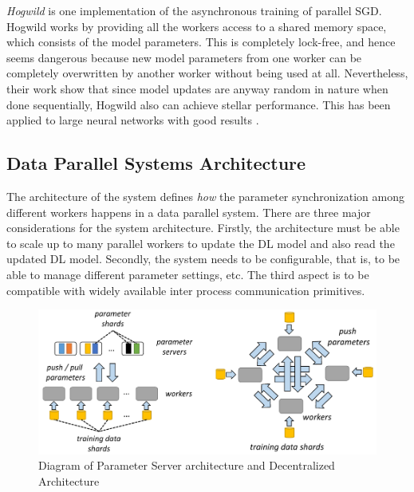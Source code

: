 \emph{Hogwild} \cite{Niu2011HOGWILD:Descent} is one implementation of the asynchronous training of parallel SGD. Hogwild works by providing all the workers access to a shared memory space, which consists of the model parameters. This is completely lock-free, and hence seems dangerous because new model parameters from one worker can be completely overwritten by another worker without being used at all. Nevertheless, their work show that since model updates are anyway random in nature when done sequentially, Hogwild also can achieve stellar performance. This has been applied to large neural networks with good results \cite{Deyringer2017ParallelizationHogwild}. 


\subsection{Data Parallel Systems Architecture}
The architecture of the system defines \emph{how} the parameter synchronization among different workers happens in a data parallel system. There are three major considerations for the system architecture. Firstly, the architecture must be able to scale up to many parallel workers to update the DL model and also read the updated DL model. Secondly, the system needs to be configurable, that is, to be able to manage different parameter settings, etc. The third aspect is to be compatible with widely available inter process communication primitives.

\begin{figure}[ht]
  \begin{center}
    \includegraphics[width=\textwidth]{images/architecture_.png} 
    \caption{Diagram of Parameter Server architecture and Decentralized Architecture  \cite{Mayer2020ScalableInfrastructures}}
    \label{fig:arch}
  \end{center}
\end{figure}


